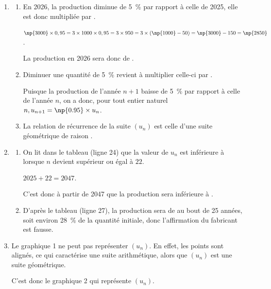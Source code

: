 \begin{enumerate}
		\item \begin{enumerate}
			\item En 2026, la production diminue de 5~\% par rapport à celle de 2025, elle est donc multipliée par .

			$\np{3000} \times 0,95 = 3 \times 1000 \times 0,95 = 3 \times 950 = 3\times (\np{1000} - 50) = \np{3000} - 150 = \np{2850}$.

			La production en 2026 sera donc de .

			\item Diminuer une quantité de 5~\% revient à multiplier celle-ci par .

			Puisque la production de l'année $n+1$ baisse de 5~\% par rapport à celle de l'année $n$, on a donc, pour tout entier naturel  \quad \mbox{$n, u_{n+1} = \np{0.95} \times u_n$}.

			\item La relation de récurrence de la suite $(u_n)$ est celle d'une suite géométrique de raison .
		\end{enumerate}

		\item \begin{enumerate}
			\item On lit dans le tableau (ligne 24) que la valeur de $u_n$ est inférieure à  lorsque $n$ devient supérieur ou égal à $22$.

			$2025 + 22 = 2047$.

			C'est donc à partir de 2047 que la production sera inférieure à .

			\item D'après le tableau (ligne 27), la production sera de  au bout de 25 années, soit environ 28~\% de la quantité initiale, donc l'affirmation du fabricant est fausse.
		\end{enumerate}

		\item Le graphique 1 ne peut pas représenter $(u_n)$. En effet, les points sont alignés, ce qui caractérise une suite arithmétique, alors que $(u_n)$ est une suite géométrique.

		C'est donc le graphique 2 qui représente $(u_n)$.
	\end{enumerate}
